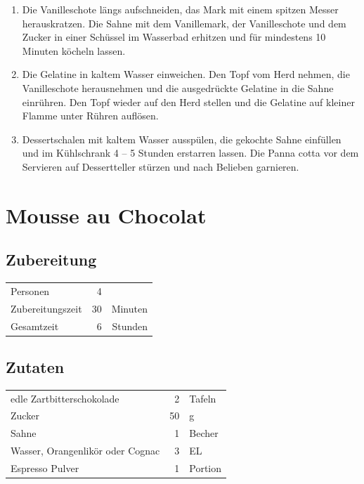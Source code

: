 \begin{enumerate}
	\item Die Vanilleschote längs aufschneiden, das Mark mit einem spitzen Messer herauskratzen. Die Sahne mit dem Vanillemark, der Vanilleschote und dem Zucker in einer Schüssel im Wasserbad erhitzen und für mindestens 10 Minuten köcheln lassen.
	\item Die Gelatine in kaltem Wasser einweichen. Den Topf vom Herd nehmen, die Vanilleschote herausnehmen und die ausgedrückte Gelatine in die Sahne einrühren. Den Topf wieder auf den Herd stellen und die Gelatine auf kleiner Flamme unter Rühren auflösen.
	\item Dessertschalen mit kaltem Wasser ausspülen, die gekochte Sahne einfüllen und im Kühlschrank 4 – 5 Stunden erstarren lassen. Die Panna cotta vor dem Servieren auf Dessertteller stürzen und nach Belieben garnieren.
\end{enumerate}

\section{Mousse au Chocolat}


\subsection*{Zubereitung}
\begin{tabular}{lrr}
	Personen         &                        4 &  \\
	Zubereitungszeit &                       30 & Minuten \\
	Gesamtzeit       &                        6 & Stunden \\
\end{tabular} 

\subsection*{Zutaten}
\begin{tabular}{lrl}
	edle Zartbitterschokolade        &  2 & Tafeln \\
	Zucker                           & 50 & g      \\
	Sahne                            &  1 & Becher \\
	Wasser, Orangenlikör oder Cognac &  3 & EL \\	
	Espresso Pulver & 1& Portion
\end{tabular} 


